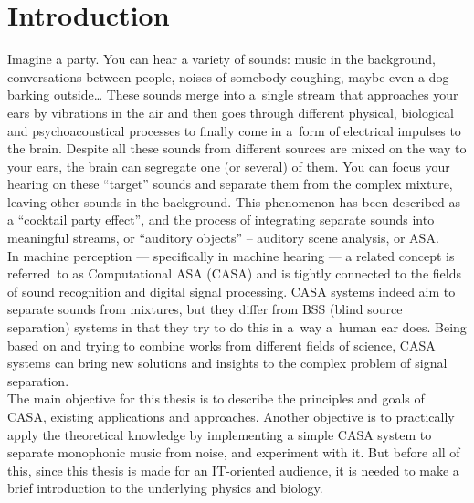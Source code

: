 \chapter{Introduction}\label{chapter:introduction}

Imagine a party. You can hear a variety of sounds: music in the background, conversations be\-tween people, noises of somebody coughing, maybe even a dog barking outside\dots{} These sounds merge into a~single stream that approaches your ears by vibrations in the air and then goes through different physical, biological and psychoacoustical processes to finally come in a~form of electrical impulses to the brain. Despite all these sounds from different sources are mixed on the way to your ears, the brain can segregate one (or several) of them. You can focus your hearing on these “target” sounds and separate them from the complex mixture, leaving other sounds in the background. This phenomenon has been described as a “cocktail party effect”, and the process of integrating separate sounds into meaningful streams, or “auditory objects” -- auditory scene analysis, or ASA.\\

In machine perception --- specifically in machine hearing --- a related concept is referred~to as Computational ASA (CASA) and is tightly connected to the fields of sound recognition and digital signal processing. CASA systems indeed aim to separate sounds from mixtures, but they differ from BSS (blind source separation) systems in that they try to do this in a~way a~human ear does. Being based on and trying to combine works from different fields of science, CASA systems can bring new solutions and insights to the complex problem of signal separation.\\

The main objective for this thesis is to describe the principles and goals of CASA, existing applications and approaches. Another objective is to practically apply the theoretical knowledge by implementing a simple CASA system to separate monophonic music from noise, and experiment with it. But before all of this, since this thesis is made for an IT-oriented audience, it is needed to make a brief introduction to the underlying physics and biology.\\

